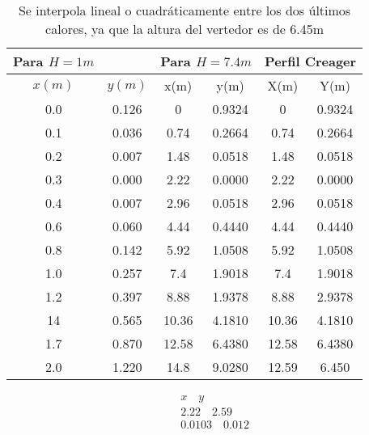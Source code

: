 \begin{table}[h!]
    \centering\begin{tabular}{@{}cccccc@{}}
    \toprule
    Para $H=1m$ &        & \multicolumn{2}{c}{Para $H=7.4m$} & \multicolumn{2}{c}{Perfil Creager} \\ \midrule
    $x(m)$      & $y(m)$ & x(m)            & y(m)            & X(m)            & Y(m)             \\
    0.0         & 0.126  & 0               & 0.9324          & 0               & 0.9324           \\
    0.1         & 0.036  & 0.74            & 0.2664          & 0.74            & 0.2664           \\
    0.2         & 0.007  & 1.48            & 0.0518          & 1.48            & 0.0518           \\
    0.3         & 0.000  & 2.22            & 0.0000          & 2.22            & 0.0000           \\
    0.4         & 0.007  & 2.96            & 0.0518          & 2.96            & 0.0518           \\
    0.6         & 0.060  & 4.44            & 0.4440          & 4.44            & 0.4440           \\
    0.8         & 0.142  & 5.92            & 1.0508          & 5.92            & 1.0508           \\
    1.0         & 0.257  & 7.4             & 1.9018          & 7.4             & 1.9018           \\
    1.2         & 0.397  & 8.88            & 1.9378          & 8.88            & 2.9378           \\
    14          & 0.565  & 10.36           & 4.1810          & 10.36           & 4.1810           \\
    1.7         & 0.870  & 12.58           & 6.4380          & 12.58           & 6.4380           \\
    2.0         & 1.220  & 14.8            & 9.0280          & 12.59           & 6.450            \\ \bottomrule
    \end{tabular}
    \caption{Se interpola lineal o cuadráticamente entre los dos últimos calores, ya que la altura del vertedor es de 6.45m}
    \label{tabhb11}
    \end{table}
\begin{align*}
    &x\quad y\\
    &2.22\quad 2.59\\
    &0.0103\quad 0.012
\end{align*}

